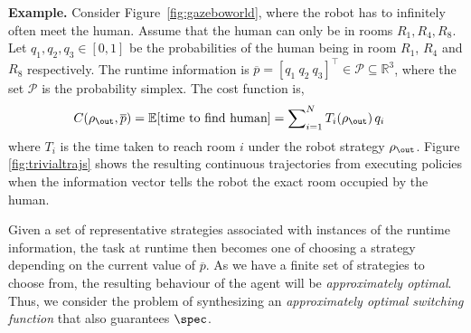 \begin{itshape}
\textbf{Example.} Consider Figure~\ref{fig:gazeboworld}, where the robot has to infinitely often meet the human. Assume that the human can only be in rooms $R_1, R_4, R_8$. Let $q_1,q_2,q_3\in[0,1]$ be the probabilities of the human being in room $R_1$, $R_4$ and $R_8$ respectively. The runtime information is $\overline{p}= {[q_1\ q_2\ q_3]}^\top \in\mathcal{P}\subseteq \mathbb{R}^3$, where the set $\mathcal{P}$ is the probability simplex. The cost function is, 
\begin{align}
C(\rho_\out, \overline{p}) &= \mathbb E\lbrack\text{time to find human\rbrack}= \sum\nolimits_{i=1}^N T_i(\rho_\out)\, q_i\label{eq:cost_fun}
\end{align}
where $T_i$ is the time taken to reach room $i$ under the robot strategy $\rho_\out$. Figure \ref{fig:trivialtrajs} shows the resulting continuous trajectories from executing policies when the information vector tells the robot the exact room occupied by the human. \label{ex:toy_ex2}
\end{itshape}




Given a set of representative strategies associated with instances of the runtime information, the task at runtime then becomes one of choosing a strategy depending on the current value of $\overline p$. As we have a finite set of strategies to choose from, the resulting behaviour of the agent will be \emph{approximately optimal}. Thus, we consider the problem of synthesizing an \emph{approximately optimal switching function} that also guarantees $\spec$.

